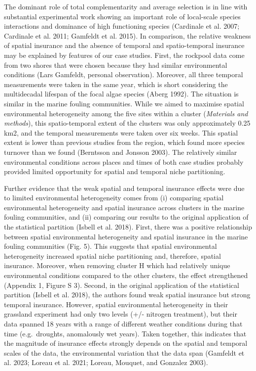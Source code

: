 \documentclass[
  letterpaper,
  DIV=11,
  numbers=noendperiod]{scrartcl}
\begin{document}
The dominant role of total complementarity and average selection is in
line with substantial experimental work showing an important role of
local-scale species interactions and dominance of high functioning
species (Cardinale et al. 2007; Cardinale et al. 2011; Gamfeldt et al.
2015). In comparison, the relative weakness of spatial insurance and the
absence of temporal and spatio-temporal insurance may be explained by
features of our case studies. First, the rockpool data come from two
shores that were chosen because they had similar environmental
conditions (Lars Gamfeldt, personal observation). Moreover, all three
temporal measurements were taken in the same year, which is short
considering the multidecadal lifespan of the focal algae species (Aberg
1992). The situation is similar in the marine fouling communities. While
we aimed to maximise spatial environmental heterogeneity among the five
sites within a cluster (\emph{Materials and methods}), this
spatio-temporal extent of the clusters was only approximately 0.25 km2,
and the temporal measurements were taken over six weeks. This spatial
extent is lower than previous studies from the region, which found more
species turnover than we found (Berntsson and Jonsson 2003). The
relatively similar environmental conditions across places and times of
both case studies probably provided limited opportunity for spatial and
temporal niche partitioning.

Further evidence that the weak spatial and temporal insurance effects
were due to limited environmental heterogeneity comes from (i) comparing
spatial environmental heterogeneity and spatial insurance across
clusters in the marine fouling communities, and (ii) comparing our
results to the original application of the statistical partition (Isbell
et al. 2018). First, there was a positive relationship between spatial
environmental heterogeneity and spatial insurance in the marine fouling
communities (Fig. 5). This suggests that spatial environmental
heterogeneity increased spatial niche partitioning and, therefore,
spatial insurance. Moreover, when removing cluster H which had
relatively unique environmental conditions compared to the other
clusters, the effect strengthened (Appendix 1, Figure S 3). Second, in
the original application of the statistical partition (Isbell et al.
2018), the authors found weak spatial insurance but strong temporal
insurance. However, spatial environmental heterogeneity in their
grassland experiment had only two levels (+/- nitrogen treatment), but
their data spanned 18 years with a range of different weather conditions
during that time (e.g.~droughts, anomalously wet years). Taken together,
this indicates that the magnitude of insurance effects strongly depends
on the spatial and temporal scales of the data, the environmental
variation that the data span (Gamfeldt et al. 2023; Loreau et al. 2021;
Loreau, Mouquet, and Gonzalez 2003).
\end{document}
